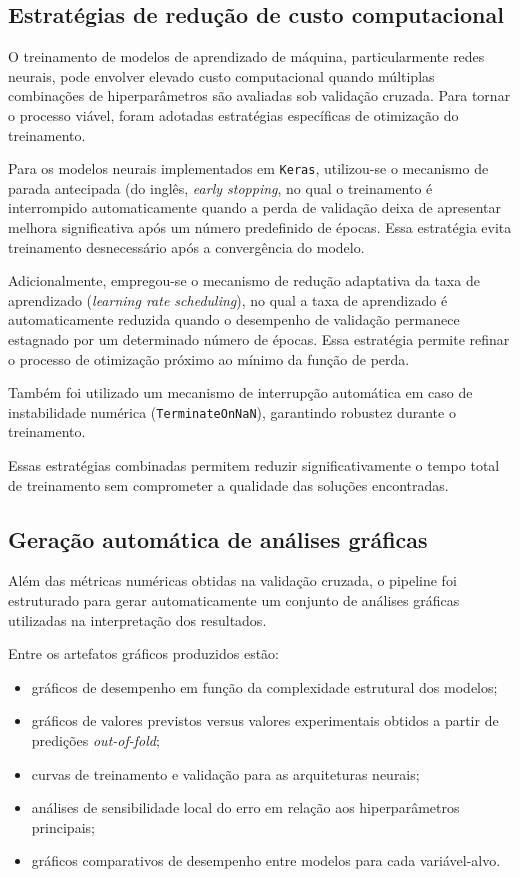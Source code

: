 \subsection{Estratégias de redução de custo computacional}

O treinamento de modelos de aprendizado de máquina, particularmente redes neurais, pode envolver elevado custo computacional quando múltiplas combinações de hiperparâmetros são avaliadas sob validação cruzada. Para tornar o processo viável, foram adotadas estratégias específicas de otimização do treinamento.

Para os modelos neurais implementados em \texttt{Keras}, utilizou-se o mecanismo de parada antecipada (do inglês, \textit{early stopping}, no qual o treinamento é interrompido automaticamente quando a perda de validação deixa de apresentar melhora significativa após um número predefinido de épocas. Essa estratégia evita treinamento desnecessário após a convergência do modelo.

Adicionalmente, empregou-se o mecanismo de redução adaptativa da taxa de aprendizado (\textit{learning rate scheduling}), no qual a taxa de aprendizado é automaticamente reduzida quando o desempenho de validação permanece estagnado por um determinado número de épocas. Essa estratégia permite refinar o processo de otimização próximo ao mínimo da função de perda.

Também foi utilizado um mecanismo de interrupção automática em caso de instabilidade numérica (\texttt{TerminateOnNaN}), garantindo robustez durante o treinamento.

Essas estratégias combinadas permitem reduzir significativamente o tempo total de treinamento sem comprometer a qualidade das soluções encontradas.

\subsection{Geração automática de análises gráficas}

Além das métricas numéricas obtidas na validação cruzada, o pipeline foi estruturado para gerar automaticamente um conjunto de análises gráficas utilizadas na interpretação dos resultados.

Entre os artefatos gráficos produzidos estão:

\begin{itemize}
\item gráficos de desempenho em função da complexidade estrutural dos modelos;
\item gráficos de valores previstos versus valores experimentais obtidos a partir de predições \textit{out-of-fold};
\item curvas de treinamento e validação para as arquiteturas neurais;
\item análises de sensibilidade local do erro em relação aos hiperparâmetros principais;
\item gráficos comparativos de desempenho entre modelos para cada variável-alvo.
\end{itemize}

